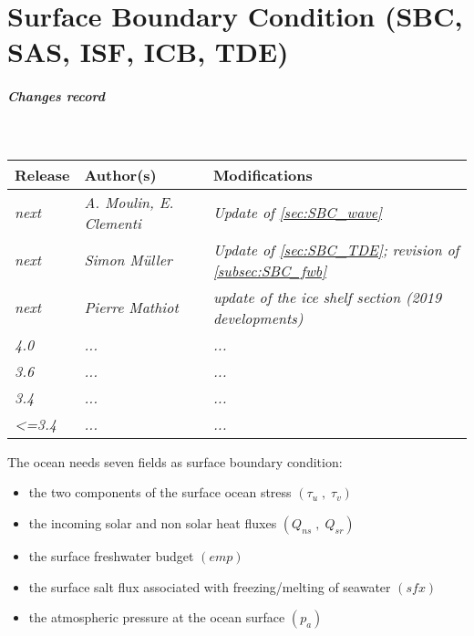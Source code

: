 \documentclass[../main/NEMO_manual]{subfiles}
\begin{document}
\chapter{Surface Boundary Condition (SBC, SAS, ISF, ICB, TDE)}
\label{chap:SBC}

\chaptertoc

\paragraph{Changes record} ~\\

{\footnotesize
  \begin{tabularx}{\textwidth}{l||X|X}
    Release & Author(s) & Modifications \\
    \hline
    {\em  next} & {\em A. Moulin, E. Clementi} & {\em Update of \autoref{sec:SBC_wave}}\\[2mm]
    {\em  next} & {\em Simon M{\" u}ller} & {\em Update of \autoref{sec:SBC_TDE}; revision of \autoref{subsec:SBC_fwb}}\\[2mm]
    {\em  next} & {\em Pierre Mathiot} & {\em update of the ice shelf section (2019 developments)}\\[2mm]  
    {\em   4.0} & {\em ...} & {\em ...} \\
    {\em   3.6} & {\em ...} & {\em ...} \\
    {\em   3.4} & {\em ...} & {\em ...} \\
    {\em <=3.4} & {\em ...} & {\em ...}
  \end{tabularx}
}

\clearpage

\begin{listing}
  \caption{}
  \label{lst:namsbc}
\end{listing}

The ocean needs seven fields as surface boundary condition:

\begin{itemize}
\item the two components of the surface ocean stress $\left( {\tau_u \;,\;\tau_v} \right)$
\item the incoming solar and non solar heat fluxes $\left( {Q_{ns} \;,\;Q_{sr} } \right)$
\item the surface freshwater budget $\left( {\textit{emp}} \right)$
\item the surface salt flux associated with freezing/melting of seawater $\left( {\textit{sfx}} \right)$
\item the atmospheric pressure at the ocean surface $\left( p_a \right)$
\end{itemize}
\end{document}
